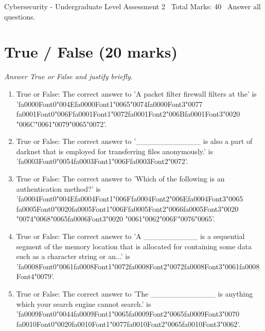 \documentclass[12pt]{article}
\begin{document}
\begin{center}
Cybersecurity - Undergraduate Level Assessment 2 \
Total Marks: 40 \
Answer all questions.
\end{center}

\section*{True / False (20 marks)}
\textit{Answer True or False and justify briefly.}
\begin{enumerate}[label=\arabic*.]
\item True or False: The correct answer to 'A packet filter firewall filters at the' is '{\csname fa0000Font0\endcsname\char"004E}{\csname fa0000Font1\endcsname\char"0065}{\char"0074}{\csname fa0000Font3\endcsname\char"0077} {\csname fa0001Font0\endcsname\char"006F}{\csname fa0001Font1\endcsname\char"0072}{\csname fa0001Font2\endcsname\char"006B}{\csname fa0001Font3\endcsname\char"0020} {\char"006C}{\char"0061}{\char"0079}{\char"0065}{\char"0072}'.
\item True or False: The correct answer to '\_\_\_\_\_\_\_\_\_\_\_\_ is also a part of darknet that is employed for transferring files anonymously.' is '{\csname fa0003Font0\endcsname\char"0054}{\csname fa0003Font1\endcsname\char"006F}{\csname fa0003Font2\endcsname\char"0072}'.
\item True or False: The correct answer to 'Which of the following is an authentication method?' is '{\csname fa0004Font0\endcsname\char"004E}{\csname fa0004Font1\endcsname\char"006F}{\csname fa0004Font2\endcsname\char"006E}{\csname fa0004Font3\endcsname\char"0065} {\csname fa0005Font0\endcsname\char"0020}{\csname fa0005Font1\endcsname\char"006F}{\csname fa0005Font2\endcsname\char"0066}{\csname fa0005Font3\endcsname\char"0020} {\char"0074}{\char"0068}{\char"0065}{\csname fa0006Font3\endcsname\char"0020} {\char"0061}{\char"0062}{\char"006F}{\char"0076}{\char"0065}'.
\item True or False: The correct answer to 'A \_\_\_\_\_\_\_\_\_\_ is a sequential segment of the memory location that is allocated for containing some data such as a character string or an...' is '{\csname fa0008Font0\endcsname\char"0061}{\csname fa0008Font1\endcsname\char"0072}{\csname fa0008Font2\endcsname\char"0072}{\csname fa0008Font3\endcsname\char"0061}{\csname fa0008Font4\endcsname\char"0079}'.
\item True or False: The correct answer to 'The \_\_\_\_\_\_\_\_\_\_\_\_ is anything which your search engine cannot search.' is '{\csname fa0009Font0\endcsname\char"0044}{\csname fa0009Font1\endcsname\char"0065}{\csname fa0009Font2\endcsname\char"0065}{\csname fa0009Font3\endcsname\char"0070} {\csname fa0010Font0\endcsname\char"0020}{\csname fa0010Font1\endcsname\char"0077}{\csname fa0010Font2\endcsname\char"0065}{\csname fa0010Font3\endcsname\char"0062}'.

\end{enumerate}
\end{document}
